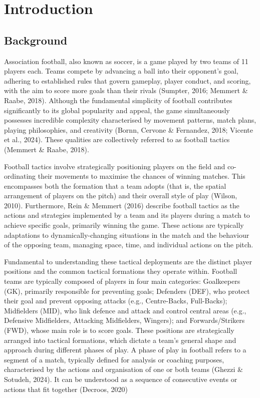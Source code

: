 \documentclass[
  a4paper,
  DIV=11,
  numbers=noendperiod,
  twoside]{scrreprt}
\begin{document}

\chapter{Introduction}\label{introduction}

\section{Background}\label{background}

Association football, also known as soccer, is a game played by two
teams of 11 players each. Teams compete by advancing a ball into their
opponent's goal, adhering to established rules that govern gameplay,
player conduct, and scoring, with the aim to score more goals than their
rivals (Sumpter, 2016; Memmert \& Raabe, 2018). Although the fundamental
simplicity of football contributes significantly to its global
popularity and appeal, the game simultaneously possesses incredible
complexity characterised by movement patterns, match plans, playing
philosophies, and creativity (Bornn, Cervone \& Fernandez, 2018; Vicente
et al., 2024). These qualities are collectively referred to as football
tactics (Memmert \& Raabe, 2018).

Football tactics involve strategically positioning players on the field
and co-ordinating their movements to maximise the chances of winning
matches. This encompasses both the formation that a team adopts (that
is, the spatial arrangement of players on the pitch) and their overall
style of play (Wilson, 2010). Furthermore, Rein \& Memmert (2016)
describe football tactics as the actions and strategies implemented by a
team and its players during a match to achieve specific goals, primarily
winning the game. These actions are typically adaptations to
dynamically-changing situations in the match and the behaviour of the
opposing team, managing space, time, and individual actions on the
pitch.

Fundamental to understanding these tactical deployments are the distinct
player positions and the common tactical formations they operate within.
Football teams are typically composed of players in four main
categories: Goalkeepers (GK), primarily responsible for preventing
goals; Defenders (DEF), who protect their goal and prevent opposing
attacks (e.g., Centre-Backs, Full-Backs); Midfielders (MID), who link
defence and attack and control central areas (e.g., Defensive
Midfielders, Attacking Midfielders, Wingers); and Forwards/Strikers
(FWD), whose main role is to score goals. These positions are
strategically arranged into tactical formations, which dictate a team's
general shape and approach during different phases of play. A phase of
play in football refers to a segment of a match, typically defined for
analysis or coaching purposes, characterised by the actions and
organisation of one or both teams (Ghezzi \& Sotudeh, 2024). It can be
understood as a sequence of consecutive events or actions that fit
together (Decroos, 2020)
\end{document}
